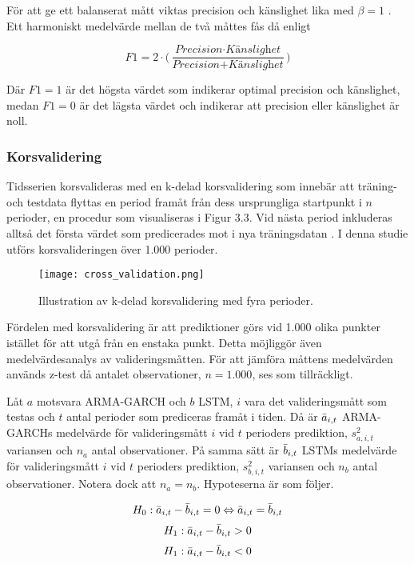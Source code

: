 \documentclass[11pt]{article}
\numberwithin{equation}{section}
\numberwithin{table}{section}
\numberwithin{figure}{section}
\begin{document}
För att ge ett balanserat mått viktas precision och känslighet lika med $\beta=1$ \parencite{ModelValidation}. Ett harmoniskt medelvärde mellan de två måttes fås då enligt

\begin{equation}
    \textit{F1} = 2 \cdot \Big( \frac{\textit{Precision} \cdot \textit{Känslighet}}{\textit{Precision} + \textit{Känslighet}} \Big)
\end{equation}

Där $F1=1$ är det högsta värdet som indikerar optimal precision och känslighet, medan $F1=0$ är det lägsta värdet och indikerar att precision eller känslighet är noll.


\subsubsection{Korsvalidering}
Tidsserien korsvalideras med en k-delad korsvalidering som innebär att träning- och testdata flyttas en period framåt från dess ursprungliga startpunkt i $n$ perioder, en procedur som visualiseras i Figur 3.3. Vid nästa period inkluderas alltså det första värdet som predicerades mot i nya träningsdatan \parencite{bergmeir2018note}. I denna studie utförs korsvalideringen över 1.000 perioder. 

\begin{figure}[H]
\caption{Illustration av k-delad korsvalidering med fyra perioder.}
\texttt{[image: cross\_validation.png]}
\centering
\end{figure}


Fördelen med korsvalidering är att prediktioner görs vid 1.000 olika punkter istället för att utgå från en enstaka punkt. Detta möjliggör även medelvärdesanalys av valideringsmåtten. För att jämföra måttens medelvärden används z-test då antalet observationer, $n=1.000$, ses som tillräckligt.

Låt $a$ motsvara ARMA-GARCH och $b$ LSTM, $i$ vara det valideringsmått som testas och $t$ antal perioder som prediceras framåt i tiden. Då är $\Bar{a}_{i,t}$ ARMA-GARCHs medelvärde för valideringsmått $i$ vid $t$ perioders prediktion, $s_{a,i,t}^2$ variansen och $n_a$ antal observationer. På samma sätt är  $\Bar{b}_{i,t}$ LSTMs medelvärde för valideringsmått $i$ vid $t$ perioders prediktion, $s_{b,i,t}^2$ variansen och $n_b$ antal observationer. Notera dock att $n_a = n_b$. Hypoteserna är som följer.

\begin{equation}
    H_0: \Bar{a}_{i,t} - \Bar{b}_{i,t} = 0 \Leftrightarrow \Bar{a}_{i,t} = \Bar{b}_{i,t}
\end{equation}
\begin{equation}
    H_1: \Bar{a}_{i,t} - \Bar{b}_{i,t} > 0
\end{equation}
\begin{equation}
    H_1: \Bar{a}_{i,t} - \Bar{b}_{i,t} < 0
\end{equation}
\end{document}
